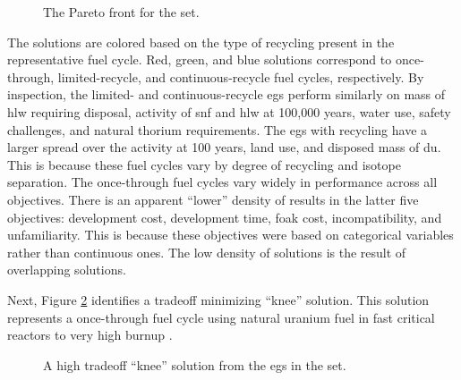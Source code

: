 \begin{figure}[htbp!]
  \centering
  \resizebox{0.85\columnwidth}{!}{}
  \caption{The Pareto front for the \ac{set}.}
  \label{fig:full-set-space}
\end{figure}

The solutions are colored based on the type of recycling present in the
representative fuel cycle. Red, green, and blue solutions correspond to
once-through, limited-recycle, and continuous-recycle fuel cycles, respectively.
By inspection, the limited- and continuous-recycle \acp{eg} perform similarly on
mass of \ac{hlw} requiring disposal, activity of \ac{snf} and \ac{hlw} at
100,000 years, water use, safety challenges, and natural thorium requirements.
The \acp{eg} with recycling have a larger spread over the activity at 100 years,
land use, and disposed mass of \ac{du}. This is because these fuel cycles vary
by degree of recycling and isotope separation. The once-through fuel cycles vary
widely in performance across all objectives. There is an apparent ``lower'' density
of results in the latter five objectives: development cost, development time, \ac{foak}
cost, incompatibility, and unfamiliarity. This is because these objectives were based on
categorical variables rather than continuous ones. The low density of solutions is the
result of overlapping solutions.



Next, Figure \ref{fig:single-eg-set-space} identifies a tradeoff minimizing
``knee'' solution. This solution represents a once-through fuel cycle using
natural uranium fuel in fast critical reactors to very high burnup
\cite{wigeland_nuclear_2014-2}.

\begin{figure}[htbp!]
  \centering
  \resizebox{0.85\columnwidth}{!}{}
  \caption{A high tradeoff ``knee'' solution from the \acp{eg} in the \ac{set}.}
  \label{fig:single-eg-set-space}
\end{figure}

